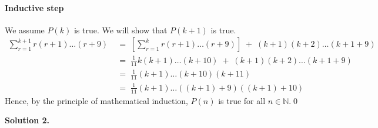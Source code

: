 \documentclass[10pt]{article}
\begin{document}
\begin{enumerate}
                \paragraph{Inductive step}
                We assume $P(k)$ is true. We will show that $P(k + 1)$ is true.
                \begin{align*}
                \sum_{r = 1}^{k + 1} r(r + 1)\dots(r + 9)
                                \;&=\; \left[\sum_{r = 1}^{k} r(r + 1)\dots(r + 9)\right] \;+\; (k + 1)(k + 2)\dots(k + 1 + 9) \\
                                \;&=\; \frac{1}{11}k(k + 1)\dots(k + 10) \;+\; (k + 1)(k + 2)\dots(k + 1 + 9) \tag{From $P(k)$}\\
                                \;&=\; \frac{1}{11}(k + 1)\dots(k + 10)(k + 11)\\
                                \;&=\; \frac{1}{11}(k + 1)\dots((k + 1) + 9)((k + 1) + 10)
                \end{align*}
                Hence, by the principle of mathematical induction, $P(n)$ is true for all $n \in \mathbb{N}$.\qed\\
        \end{enumerate}
        \textbf{Solution 2.}
\end{document}
